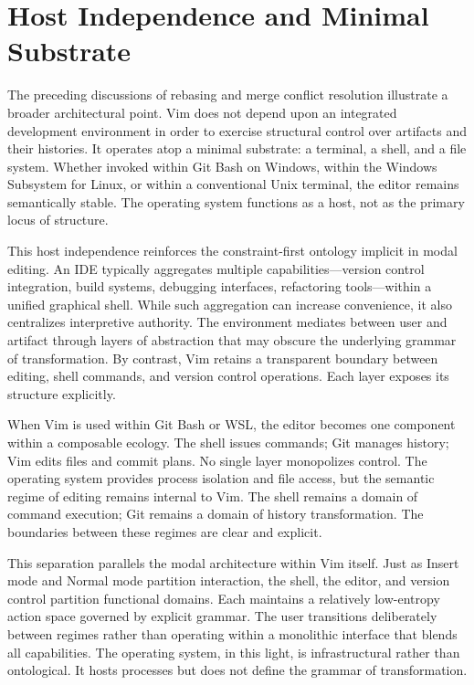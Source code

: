 \documentclass[12pt]{article}
\begin{document}
\section{Host Independence and Minimal Substrate}

The preceding discussions of rebasing and merge conflict resolution illustrate a broader architectural point. Vim does not depend upon an integrated development environment in order to exercise structural control over artifacts and their histories. It operates atop a minimal substrate: a terminal, a shell, and a file system. Whether invoked within Git Bash on Windows, within the Windows Subsystem for Linux, or within a conventional Unix terminal, the editor remains semantically stable. The operating system functions as a host, not as the primary locus of structure.

This host independence reinforces the constraint-first ontology implicit in modal editing. An IDE typically aggregates multiple capabilities—version control integration, build systems, debugging interfaces, refactoring tools—within a unified graphical shell. While such aggregation can increase convenience, it also centralizes interpretive authority. The environment mediates between user and artifact through layers of abstraction that may obscure the underlying grammar of transformation. By contrast, Vim retains a transparent boundary between editing, shell commands, and version control operations. Each layer exposes its structure explicitly.

When Vim is used within Git Bash or WSL, the editor becomes one component within a composable ecology. The shell issues commands; Git manages history; Vim edits files and commit plans. No single layer monopolizes control. The operating system provides process isolation and file access, but the semantic regime of editing remains internal to Vim. The shell remains a domain of command execution; Git remains a domain of history transformation. The boundaries between these regimes are clear and explicit.

This separation parallels the modal architecture within Vim itself. Just as Insert mode and Normal mode partition interaction, the shell, the editor, and version control partition functional domains. Each maintains a relatively low-entropy action space governed by explicit grammar. The user transitions deliberately between regimes rather than operating within a monolithic interface that blends all capabilities. The operating system, in this light, is infrastructural rather than ontological. It hosts processes but does not define the grammar of transformation.
\end{document}
